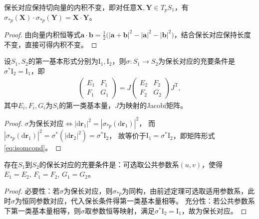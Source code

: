 \documentclass[../../main.tex]{subfiles}%
\begin{document}
\begin{proposition}
保长对应保持切向量的内积不变，即对任意$\boldsymbol{X},\boldsymbol{Y}\in T_pS_1$，有$\sigma_{*p}(\boldsymbol{X})\cdot\sigma_{*p}(\boldsymbol{Y})=\boldsymbol{X}\cdot\boldsymbol{Y}$。
\end{proposition}
\begin{proof}

由向量内积恒等式$\boldsymbol{a}\cdot\boldsymbol{b}=\frac{1}{2}\big(|\boldsymbol{a}+\boldsymbol{b}|^2-|\boldsymbol{a}|^2-|\boldsymbol{b}|^2\big)$，结合保长对应保持长度不变，直接可得内积不变。

\end{proof}

\begin{theorem}
设$S_1,S_2$的第一基本形式分别为$\mathrm{I}_1,\mathrm{I}_2$，则$\sigma:S_1\to S_2$为保长对应的充要条件是$\sigma^*\mathrm{I}_2=\mathrm{I}_1$，即
\begin{align}
\begin{pmatrix}E_1&F_1\\F_1&G_1\end{pmatrix}=J\begin{pmatrix}E_2&F_2\\F_2&G_2\end{pmatrix}J^\mathrm{T},\label{eq:isomcond}
\end{align}
其中$E_i,F_i,G_i$为$S_i$的第一类基本量，$J$为映射的Jacobi矩阵。
\end{theorem}
\begin{proof}

$\sigma$为保长对应$\iff|\mathrm{d}\boldsymbol{r}_1|^2=|\sigma_{*p}(\mathrm{d}\boldsymbol{r}_1)|^2$，
而$|\sigma_{*p}(\mathrm{d}\boldsymbol{r}_1)|^2=\sigma^*(|\mathrm{d}\boldsymbol{r}_2|^2)=\sigma^*\mathrm{I}_2$，
故等价于$\mathrm{I}_1=\sigma^*\mathrm{I}_2$，即矩阵形式\eqref{eq:isomcond}。

\end{proof}

\begin{theorem}
存在$S_1$到$S_2$的保长对应的充要条件是：可选取公共参数系$(u,v)$，使得$E_1=E_2,\,F_1=F_2,\,G_1=G_2$。
\end{theorem}
\begin{proof}

必要性：若$\sigma$为保长对应，则$\sigma_{*p}$为同构，由前述定理可选取适用参数系，此时$\sigma$为恒同参数对应，代入保长条件得第一类基本量相等。
充分性：若公共参数系下第一类基本量相等，则$\sigma$取参数恒等映射，满足$\sigma^*\mathrm{I}_2=\mathrm{I}_1$，故为保长对应。

\end{proof}
\end{document}
